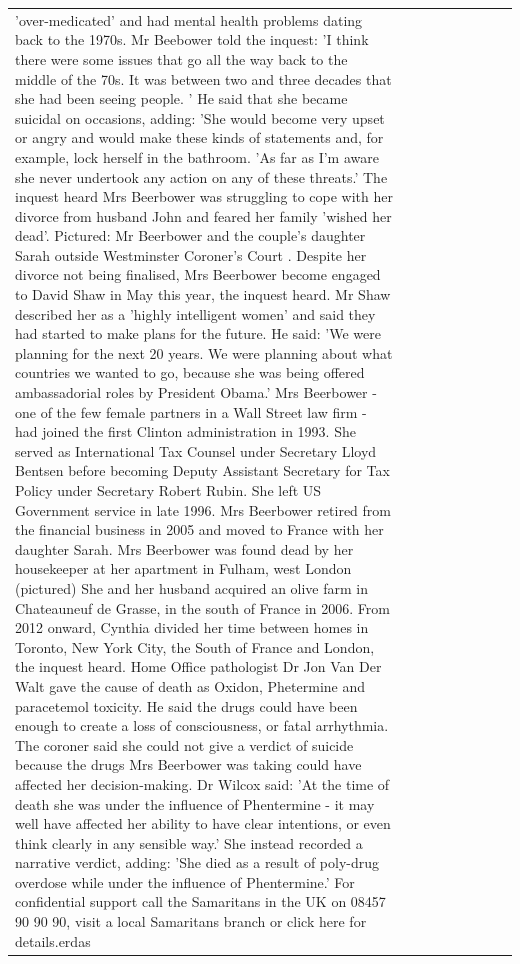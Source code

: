 \begin{table}[H]
\begin{tabular}{lllrlllll}
'over-medicated' and had mental health problems dating back to the 1970s. Mr Beebower told the inquest: 'I think there were some issues that go all the way back to the middle of the 70s. It was between two and three decades that she had been seeing people. ' He said that she became suicidal on occasions, adding: 'She would become very upset or angry and would make these kinds of statements and, for example, lock herself in the bathroom. 'As far as I'm aware she never undertook any action on any of these threats.' The inquest heard Mrs Beerbower was struggling to cope with her divorce from husband John and feared her family 'wished her dead'. Pictured: Mr Beerbower and the couple's daughter Sarah outside Westminster Coroner's Court . Despite her divorce not being finalised, Mrs Beerbower become engaged to David Shaw in May this year, the inquest heard. Mr Shaw described her as a 'highly intelligent women' and said they had started to make plans for the future. He said: 'We were planning for the next 20 years. We were planning about what countries we wanted to go, because she was being offered ambassadorial roles by President Obama.' Mrs Beerbower - one of the few female partners in a Wall Street law firm - had joined the first Clinton administration in 1993. She served as International Tax Counsel under Secretary Lloyd Bentsen before becoming Deputy Assistant Secretary for Tax Policy under Secretary Robert Rubin. She left US Government service in late 1996. Mrs Beerbower retired from the financial business in 2005 and moved to France with her daughter Sarah. Mrs Beerbower was found dead by her housekeeper at her apartment in Fulham, west London (pictured) She and her husband acquired an olive farm in Chateauneuf de Grasse, in the south of France in 2006. From 2012 onward, Cynthia divided her time between homes in Toronto, New York City, the South of France and London, the inquest heard. Home Office pathologist Dr Jon Van Der Walt gave the cause of death as Oxidon, Phetermine and paracetemol toxicity. He said the drugs could have been enough to create a loss of consciousness, or fatal arrhythmia. The coroner said she could not give a verdict of suicide because the drugs Mrs Beerbower was taking could have affected her decision-making. Dr Wilcox said: 'At the time of death she was under the influence of Phentermine - it may well have affected her ability to have clear intentions, or even think clearly in any sensible way.' She instead recorded a narrative verdict, adding: 'She died as a result of poly-drug overdose while under the influence of Phentermine.' For confidential support call the Samaritans in the UK on 08457 90 90 90, visit a local Samaritans branch or click here for details.erdas \\

\end{tabular}
\end{table}
